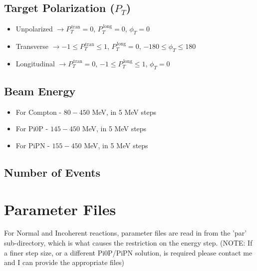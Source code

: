 \documentclass[twoside,letterpaper,12pt]{article}
\begin{document}
\subsection{Target Polarization ($P_{T}$)}
\begin{itemize}
\item Unpolarized $\rightarrow P_{T}^{\,\mathrm{tran}}=0$, $P_{T}^{\,\mathrm{long}}=0$, $\phi_{T}=0$
\item Transverse $\rightarrow -1\leq P_{T}^{\,\mathrm{tran}}\leq 1$, $P_{T}^{\,\mathrm{long}}=0$, $-180\leq \phi_{T}\leq 180$
\item Longitudinal  $\rightarrow P_{T}^{\,\mathrm{tran}}=0$, $-1\leq P_{T}^{\,\mathrm{long}}\leq 1$, $\phi_{T}=0$
\end{itemize}

\subsection{Beam Energy}
\begin{itemize}
\item For Compton - $80-450$ MeV, in 5 MeV steps
\item For Pi0P - $145-450$ MeV, in 5 MeV steps
\item For PiPN - $155-450$ MeV, in 5 MeV steps
\end{itemize}

\subsection{Number of Events}

\section{Parameter Files}
For Normal and Incoherent reactions, parameter files are read in from the 'par' sub-directory, which is what causes the restriction on the energy step. (NOTE: If a finer step size, or a different Pi0P/PiPN solution, is required please contact me and I can provide the appropriate files)
\end{document}
